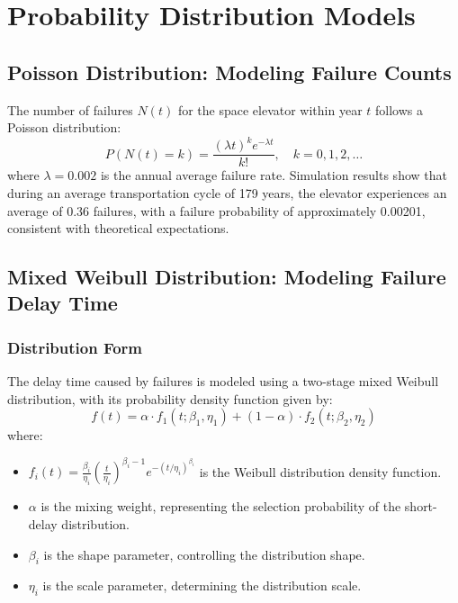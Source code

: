 \documentclass{article}
\begin{document}
\section{Probability Distribution Models}
\subsection{Poisson Distribution: Modeling Failure Counts}
The number of failures $N(t)$ for the space elevator within year $t$ follows a Poisson distribution:
\[
P(N(t) = k) = \frac{(\lambda t)^{k}e^{-\lambda t}}{k!}, \quad k = 0,1,2,\ldots
\]
where $\lambda = 0.002$ is the annual average failure rate. Simulation results show that during an average transportation cycle of 179 years, the elevator experiences an average of 0.36 failures, with a failure probability of approximately 0.00201, consistent with theoretical expectations.

\subsection{Mixed Weibull Distribution: Modeling Failure Delay Time}
\subsubsection{Distribution Form}
The delay time caused by failures is modeled using a two-stage mixed Weibull distribution, with its probability density function given by:
\[
f(t) = \alpha \cdot f_{1}(t;\beta_{1},\eta_{1}) + (1 - \alpha) \cdot f_{2}(t;\beta_{2},\eta_{2})
\]
where:
\begin{itemize}
    \item $f_i(t) = \frac{\beta_i}{\eta_i} \left( \frac{t}{\eta_i} \right)^{\beta_i-1} e^{-(t/\eta_i)^{\beta_i}}$ is the Weibull distribution density function.
    \item $\alpha$ is the mixing weight, representing the selection probability of the short-delay distribution.
    \item $\beta_i$ is the shape parameter, controlling the distribution shape.
    \item $\eta_i$ is the scale parameter, determining the distribution scale.
\end{itemize}
\end{document}

